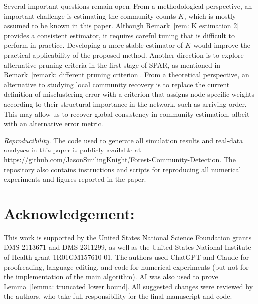 \documentclass[twoside,11pt]{article}
\theoremstyle{remark}
\begin{document}
Several important questions remain open.
From a methodological perspective, an important challenge is estimating the community counts $K$, which is mostly assumed to be known in this paper. Although Remark~\ref{rem: K estimation 2} provides a consistent estimator, it requires careful tuning that is difficult to perform in practice. 
Developing a more stable estimator of $K$ would improve the practical applicability of the proposed method.
Another direction is to explore alternative pruning criteria in the first stage of SPAR, as mentioned in Remark~\ref{remark: different pruning criterion}. From a theoretical perspective, an alternative to studying local community recovery is to replace the current definition of misclustering error with a criterion that assigns node-specific weights according to their structural importance in the network, such as arriving order. This may allow us to recover global consistency in community estimation, albeit with an alternative error metric.



 


\par\noindent\textit{Reproducibility.}
The code used to generate all simulation results and real-data analyses in this paper is publicly available at \url{https://github.com/JasonSmilingKnight/Forest-Community-Detection}. The repository also contains instructions and scripts for reproducing all numerical experiments and figures reported in the paper.

\section*{Acknowledgement:} This work is supported by the United States National Science Foundation grants DMS-2113671 and DMS-2311299, as well as the United States National Institute of Health grant 1R01GM157610-01. 
The authors used ChatGPT and Claude for proofreading, language editing, and code for numerical experiments (but not for the implementation of the main algorithm). AI was also used to prove Lemma~\ref{lemma: truncated lower bound}. All suggested changes were reviewed by the authors, who take full responsibility for the final manuscript and code.
\end{document}
